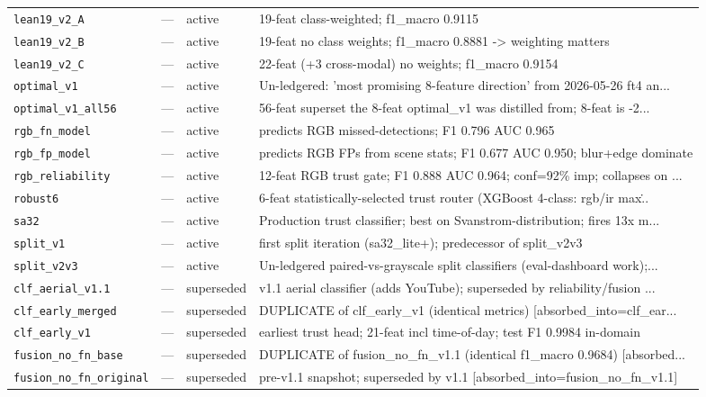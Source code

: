 \documentclass[12pt,a4paper,oneside,openright]{book}
\begin{document}
\begin{longtable}{p{}llp{}}
\texttt{lean19\_v2\_A} & --- & active & 19-feat class-weighted; f1\_macro 0.9115 \\
\texttt{lean19\_v2\_B} & --- & active & 19-feat no class weights; f1\_macro 0.8881 -> weighting matters \\
\texttt{lean19\_v2\_C} & --- & active & 22-feat (+3 cross-modal) no weights; f1\_macro 0.9154 \\
\texttt{optimal\_v1} & --- & active & Un-ledgered: 'most promising 8-feature direction' from 2026-05-26 ft4 an... \\
\texttt{optimal\_v1\_all56} & --- & active & 56-feat superset the 8-feat optimal\_v1 was distilled from; 8-feat is -2... \\
\texttt{rgb\_fn\_model} & --- & active & predicts RGB missed-detections; F1 0.796 AUC 0.965 \\
\texttt{rgb\_fp\_model} & --- & active & predicts RGB FPs from scene stats; F1 0.677 AUC 0.950; blur+edge dominate \\
\texttt{rgb\_reliability} & --- & active & 12-feat RGB trust gate; F1 0.888 AUC 0.964; conf=92\% imp; collapses on ... \\
\texttt{robust6} & --- & active & 6-feat statistically-selected trust router (XGBoost 4-class: rgb/ir max\... \\
\texttt{sa32} & --- & active & Production trust classifier; best on Svanstrom-distribution; fires 13x m... \\
\texttt{split\_v1} & --- & active & first split iteration (sa32\_lite+); predecessor of split\_v2v3 \\
\texttt{split\_v2v3} & --- & active & Un-ledgered paired-vs-grayscale split classifiers (eval-dashboard work);... \\
\texttt{clf\_aerial\_v1.1} & --- & superseded & v1.1 aerial classifier (adds YouTube); superseded by reliability/fusion ... \\
\texttt{clf\_early\_merged} & --- & superseded & DUPLICATE of clf\_early\_v1 (identical metrics) [absorbed\_into=clf\_ear... \\
\texttt{clf\_early\_v1} & --- & superseded & earliest trust head; 21-feat incl time-of-day; test F1 0.9984 in-domain \\
\texttt{fusion\_no\_fn\_base} & --- & superseded & DUPLICATE of fusion\_no\_fn\_v1.1 (identical f1\_macro 0.9684) [absorbed... \\
\texttt{fusion\_no\_fn\_original} & --- & superseded & pre-v1.1 snapshot; superseded by v1.1 [absorbed\_into=fusion\_no\_fn\_v1.1] \\

\end{longtable}
\end{document}
